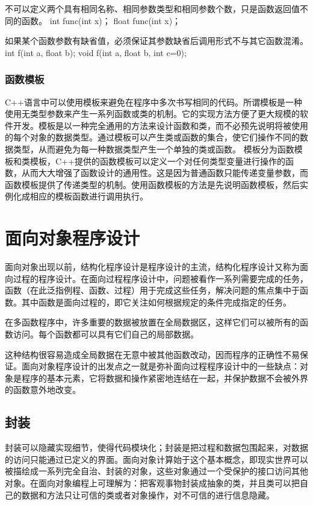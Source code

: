 不可以定义两个具有相同名称、相同参数类型和相同参数个数，只是函数返回值不同的函数。
int func(int x)；
float func(int x)；

如果某个函数参数有缺省值，必须保证其参数缺省后调用形式不与其它函数混淆。
int f(int a, float b);
void f(int a, float b, int c=0);

\subsubsection{函数模板}
C++语言中可以使用模板来避免在程序中多次书写相同的代码。所谓模板是一种使用无类型参数来产生一系列函数或类的机制。它的实现方法方便了更大规模的软件开发。模板是以一种完全通用的方法来设计函数和类，而不必预先说明将被使用的每个对象的数据类型。通过模板可以产生类或函数的集合，使它们操作不同的数据类型，从而避免为每一种数据类型产生一个单独的类或函数。
模板分为函数模板和类模板，C++提供的函数模板可以定义一个对任何类型变量进行操作的函数，从而大大增强了函数设计的通用性。这是因为普通函数只能传递变量参数，而函数模板提供了传递类型的机制。使用函数模板的方法是先说明函数模板，然后实例化成相应的模板函数进行调用执行。



\section{面向对象程序设计}
面向对象出现以前，结构化程序设计是程序设计的主流，结构化程序设计又称为面向过程的程序设计。在面向过程程序设计中，问题被看作一系列需要完成的任务，函数（在此泛指例程、函数、过程）用于完成这些任务，解决问题的焦点集中于函数。其中函数是面向过程的，即它关注如何根据规定的条件完成指定的任务。

在多函数程序中，许多重要的数据被放置在全局数据区，这样它们可以被所有的函数访问。每个函数都可以具有它们自己的局部数据。

这种结构很容易造成全局数据在无意中被其他函数改动，因而程序的正确性不易保证。面向对象程序设计的出发点之一就是弥补面向过程程序设计中的一些缺点：对象是程序的基本元素，它将数据和操作紧密地连结在一起，并保护数据不会被外界的函数意外地改变。

\subsection{封装}
封装可以隐藏实现细节，使得代码模块化；封装是把过程和数据包围起来，对数据的访问只能通过已定义的界面。面向对象计算始于这个基本概念，即现实世界可以被描绘成一系列完全自治、封装的对象，这些对象通过一个受保护的接口访问其他对象。在面向对象编程上可理解为：把客观事物封装成抽象的类，并且类可以把自己的数据和方法只让可信的类或者对象操作，对不可信的进行信息隐藏。

